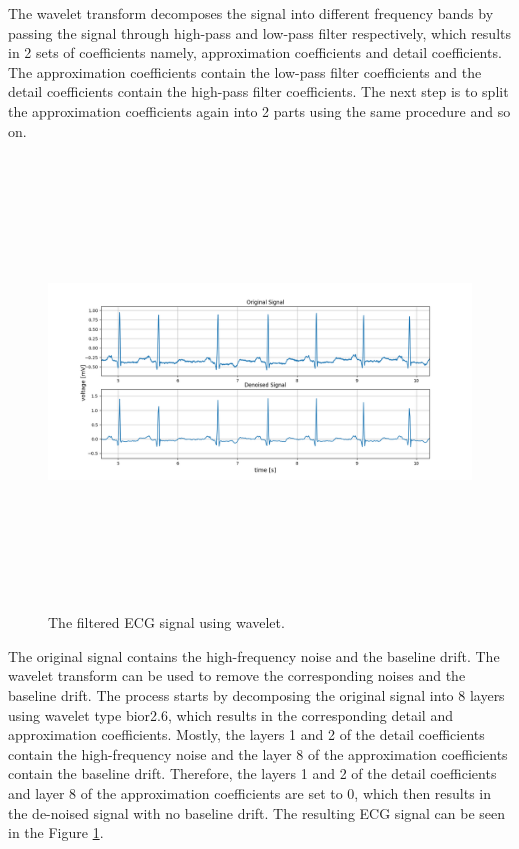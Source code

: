 The wavelet transform decomposes the signal into different frequency bands by passing the signal through high-pass and low-pass filter respectively, which results in 2 sets of coefficients namely, approximation coefficients and detail coefficients. The approximation coefficients contain the low-pass filter coefficients and the detail coefficients contain the high-pass filter coefficients. The next step is to split the approximation coefficients again into 2 parts using the same procedure and so on.

\begin{figure}[h]
	\centering
	\includegraphics[width=15cm,height=12cm,keepaspectratio=true]{images/wavelet_denoised_1}
	\caption{
		The filtered ECG signal using wavelet.
	}
	\label{fig:wavelet_denoised}
\end{figure}


The original signal contains the high-frequency noise and the baseline drift. The wavelet transform can be used to remove the corresponding noises and the baseline drift. The process starts by decomposing the original signal into 8 layers using wavelet type bior2.6, which results in the corresponding detail and approximation coefficients. Mostly, the layers 1 and 2 of the detail coefficients contain the high-frequency noise and the layer 8 of the approximation coefficients contain the baseline drift. Therefore, the layers 1 and 2 of the detail coefficients and layer 8 of the approximation coefficients are set to 0, which then results in the de-noised signal with no baseline drift. The resulting ECG signal can be seen in the Figure \ref{fig:wavelet_denoised}. 




